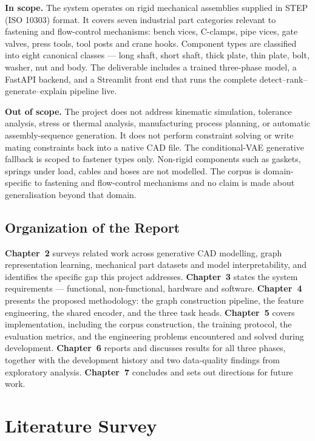 \documentclass[12pt,oneside,a4paper]{report}
\begin{document}
\textbf{In scope.} The system operates on rigid mechanical assemblies
supplied in STEP (ISO 10303) format. It covers seven industrial part
categories relevant to fastening and flow-control mechanisms: bench vices,
C-clamps, pipe vices, gate valves, press tools, tool posts and crane hooks.
Component types are classified into eight canonical classes --- long shaft,
short shaft, thick plate, thin plate, bolt, washer, nut and body. The
deliverable includes a trained three-phase model, a FastAPI backend, and a
Streamlit front end that runs the complete detect--rank--generate--explain
pipeline live.

\textbf{Out of scope.} The project does not address kinematic simulation,
tolerance analysis, stress or thermal analysis, manufacturing process
planning, or automatic assembly-sequence generation. It does not perform
constraint solving or write mating constraints back into a native CAD file.
The conditional-VAE generative fallback is scoped to fastener types only.
Non-rigid components such as gaskets, springs under load, cables and hoses
are not modelled. The corpus is domain-specific to fastening and
flow-control mechanisms and no claim is made about generalisation beyond
that domain.

\section{Organization of the Report}

\textbf{Chapter~2} surveys related work across generative CAD modelling,
graph representation learning, mechanical part datasets and model
interpretability, and identifies the specific gap this project addresses.
\textbf{Chapter~3} states the system requirements --- functional,
non-functional, hardware and software. \textbf{Chapter~4} presents the
proposed methodology: the graph construction pipeline, the feature
engineering, the shared encoder, and the three task heads.
\textbf{Chapter~5} covers implementation, including the corpus construction,
the training protocol, the evaluation metrics, and the engineering problems
encountered and solved during development. \textbf{Chapter~6} reports and
discusses results for all three phases, together with the development history
and two data-quality findings from exploratory analysis. \textbf{Chapter~7}
concludes and sets out directions for future work.

\chapter{Literature Survey}
\end{document}
